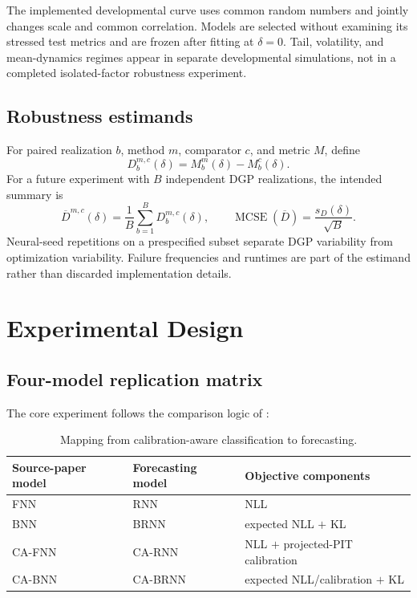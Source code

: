 \documentclass[11pt]{article}
\begin{document}
The implemented developmental curve uses common random numbers and jointly changes
scale and common correlation. Models are selected without examining its stressed
test metrics and are frozen after fitting at $\delta=0$. Tail, volatility, and
mean-dynamics regimes appear in separate developmental simulations, not in a
completed isolated-factor robustness experiment.

\subsection{Robustness estimands}

For paired realization $b$, method $m$, comparator $c$, and metric $M$, define
\[
D_b^{m,c}(\delta)=M_b^m(\delta)-M_b^c(\delta).
\]
For a future experiment with $B$ independent DGP realizations, the intended
summary is
\[
\overline D^{m,c}(\delta)=\frac1B\sum_{b=1}^B D_b^{m,c}(\delta),
\qquad
\operatorname{MCSE}(\overline D)=
\frac{s_D(\delta)}{\sqrt B}.
\]
Neural-seed repetitions on a prespecified subset separate DGP variability from
optimization variability. Failure frequencies and runtimes are part of the
estimand rather than discarded implementation details.

\section{Experimental Design}

\subsection{Four-model replication matrix}

The core experiment follows the comparison logic of
\cite{huang2024cabl}:
\begin{table}[ht]
\centering
\caption{Mapping from calibration-aware classification to forecasting.}
\begin{tabular}{lll}
\toprule
Source-paper model & Forecasting model & Objective components \\
\midrule
FNN & RNN & NLL \\
BNN & BRNN & expected NLL $+$ KL \\
CA-FNN & CA-RNN & NLL $+$ projected-PIT calibration \\
CA-BNN & CA-BRNN & expected NLL/calibration $+$ KL \\
\bottomrule
\end{tabular}
\end{table}
\end{document}
